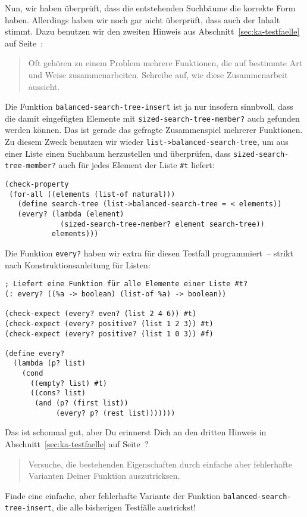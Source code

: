 Nun, wir haben überprüft, dass die entstehenden Suchbäume die korrekte
Form haben.  Allerdings haben wir noch gar nicht überprüft, dass auch
der Inhalt stimmt.  Dazu benutzen wir den zweiten Hinweis aus
Abschnitt~\ref{sec:ka-testfaelle} auf
Seite~\pageref{sec:ka-testfaelle}:
%
\begin{quote}
  Oft gehören zu einem Problem mehrere Funktionen, die auf bestimmte
  Art und Weise zusammenarbeiten.  Schreibe auf, wie diese
  Zusammenarbeit aussieht.
\end{quote}
%
Die Funktion \lstinline{balanced-search-tree-insert} ist ja nur
insofern sinnbvoll, dass die damit eingefügten Elemente mit
\lstinline{sized-search-tree-member?} auch gefunden werden können. Das
ist gerade das gefragte Zusammenspiel mehrerer Funktionen.  Zu diesem
Zweck benutzen wir wieder \lstinline{list->balanced-search-tree}, um
aus einer Liste einen Suchbaum herzustellen und überprüfen, dass
\lstinline{sized-search-tree-member?} auch für jedes Element der Liste
\lstinline{#t} liefert:
%
\begin{lstlisting}
(check-property
 (for-all ((elements (list-of natural)))
   (define search-tree (list->balanced-search-tree = < elements))
   (every? (lambda (element)
             (sized-search-tree-member? element search-tree))
           elements)))
\end{lstlisting}
%
Die Funktion \lstinline{every?} haben wir extra für diesen Testfall
programmiert~-- strikt nach Konstruktionsanleitung für Listen:\label{func:everyp}
%
\begin{lstlisting}
; Liefert eine Funktion für alle Elemente einer Liste #t?
(: every? ((%a -> boolean) (list-of %a) -> boolean))

(check-expect (every? even? (list 2 4 6)) #t)
(check-expect (every? positive? (list 1 2 3)) #t)
(check-expect (every? positive? (list 1 0 3)) #f)

(define every?
  (lambda (p? list)
    (cond
      ((empty? list) #t)
      ((cons? list)
       (and (p? (first list))
            (every? p? (rest list)))))))
\end{lstlisting}
%
Das ist schonmal gut, aber Du erinnerst Dich an den dritten Hinweis in
Abschnitt~\ref{sec:ka-testfaelle} auf
Seite~\pageref{sec:ka-testfaelle}?
%
\begin{quote}
  Versuche, die bestehenden Eigenschaften durch einfache aber
  fehlerhafte Varianten Deiner Funktion auszutricksen.
\end{quote}
%
\begin{aufgabeinline}
  Finde eine einfache, aber fehlerhafte Variante der Funktion
  \lstinline{balanced-search-tree-insert}, die alle bisherigen
  Testfälle austrickst!
\end{aufgabeinline}
